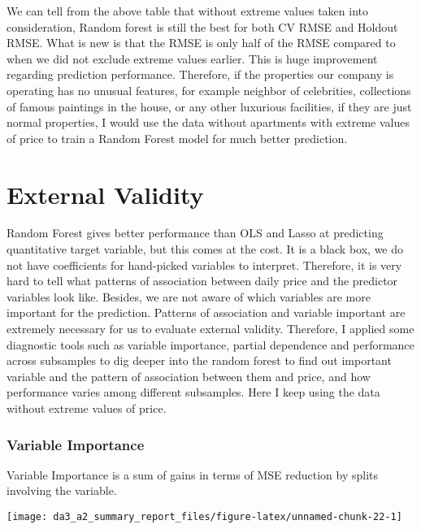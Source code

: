\documentclass[
]{article}
\begin{document}
We can tell from the above table that without extreme values taken into
consideration, Random forest is still the best for both CV RMSE and
Holdout RMSE. What is new is that the RMSE is only half of the RMSE
compared to when we did not exclude extreme values earlier. This is huge
improvement regarding prediction performance. Therefore, if the
properties our company is operating has no unusual features, for example
neighbor of celebrities, collections of famous paintings in the house,
or any other luxurious facilities, if they are just normal properties, I
would use the data without apartments with extreme values of price to
train a Random Forest model for much better prediction.

\hypertarget{external-validity}{%
\section{External Validity}\label{external-validity}}

Random Forest gives better performance than OLS and Lasso at predicting
quantitative target variable, but this comes at the cost. It is a black
box, we do not have coefficients for hand-picked variables to interpret.
Therefore, it is very hard to tell what patterns of association between
daily price and the predictor variables look like. Besides, we are not
aware of which variables are more important for the prediction. Patterns
of association and variable important are extremely necessary for us to
evaluate external validity. Therefore, I applied some diagnostic tools
such as variable importance, partial dependence and performance across
subsamples to dig deeper into the random forest to find out important
variable and the pattern of association between them and price, and how
performance varies among different subsamples. Here I keep using the
data without extreme values of price.

\hypertarget{variable-importance}{%
\subsubsection{Variable Importance}\label{variable-importance}}

Variable Importance is a sum of gains in terms of MSE reduction by
splits involving the variable.

\begin{center}\texttt{[image: da3\_a2\_summary\_report\_files/figure-latex/unnamed-chunk-22-1]} \end{center}
\end{document}
